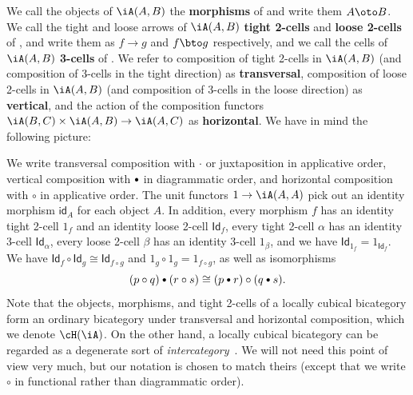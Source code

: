\documentclass{amsart}
\let\tc\cdot
\newcommand{\bc}{\mathbin{\raisebox{1pt}{\scriptsize$\bullet$}}}
\let\oc\circ
\renewcommand{\id}{\mathsf{id}}
\newcommand{\Id}{\mathsf{Id}}
\begin{document}
We call the objects of $\iA(A,B)$ the \textbf{morphisms} of \iA and write them $A\oto B$.
We call the tight and loose arrows of $\iA(A,B)$ \textbf{tight 2-cells} and \textbf{loose 2-cells} of \iA, and write them as $f\to g$ and $f\bto g$ respectively, and we call the cells of $\iA(A,B)$ \textbf{3-cells} of \iA.
We refer to composition of tight 2-cells in $\iA(A,B)$ (and composition of 3-cells in the tight direction) as \textbf{transversal}, composition of loose 2-cells in $\iA(A,B)$ (and composition of 3-cells in the loose direction) as \textbf{vertical}, and the action of the composition functors $\iA(B,C)\times \iA(A,B) \to \iA(A,C)$ as \textbf{horizontal}.
We have in mind the following picture:
\begin{center}
\end{center}

We write transversal composition with $\tc$ or juxtaposition in applicative order, vertical composition with $\bc $ in diagrammatic order, and horizontal composition with $\oc$ in applicative order.
The unit functors $1\to\iA(A,A)$ pick out an identity morphism $\id_A$ for each object $A$.
In addition, every morphism $f$ has an identity tight 2-cell $1_f$ and an identity loose 2-cell $\Id_f$, every tight 2-cell $\alpha$ has an identity 3-cell $\Id_\alpha$, every loose 2-cell $\beta$ has an identity 3-cell $1_\beta$, and we have $\Id_{1_f} = 1_{\Id_f}$.
We have $\Id_f \oc \Id_{g} \cong \Id_{f\oc g}$ and $1_g \oc 1_g = 1_{f\oc g}$, as well as isomorphisms
\begin{equation}
  (p\oc q) \bc (r\oc s) \cong (p\bc r) \oc (q\bc s).\label{eq:interchange}
\end{equation}
Note that the objects, morphisms, and tight 2-cells of a locally cubical bicategory \iA form an ordinary bicategory under transversal and horizontal composition, which we denote $\cH(\iA)$.
On the other hand, a locally cubical bicategory can be regarded as a degenerate sort of \emph{intercategory}~\cite{gp:intercategories-i}.
We will not need this point of view very much, but our notation is chosen to match theirs (except that we write $\oc$ in functional rather than diagrammatic order).
\end{document}
